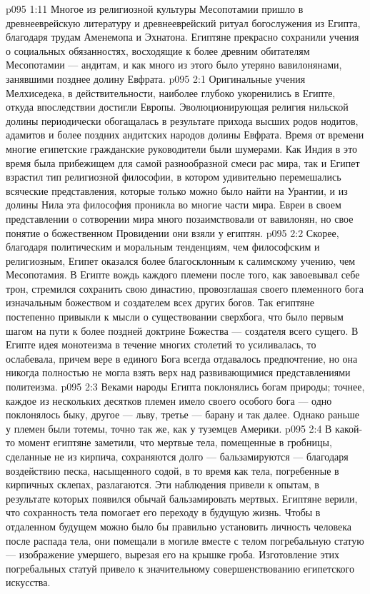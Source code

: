\vs p095 1:11 Многое из религиозной культуры Месопотамии пришло в древнееврейскую литературу и древнееврейский ритуал богослужения из Египта, благодаря трудам Аменемопа и Эхнатона. Египтяне прекрасно сохранили учения о социальных обязанностях, восходящие к более древним обитателям Месопотамии --- андитам, и как много из этого было утеряно вавилонянами, занявшими позднее долину Евфрата.
\vs p095 2:1 Оригинальные учения Мелхиседека, в действительности, наиболее глубоко укоренились в Египте, откуда впоследствии достигли Европы. Эволюционирующая религия нильской долины периодически обогащалась в результате прихода высших родов нодитов, адамитов и более поздних андитских народов долины Евфрата. Время от времени многие египетские гражданские руководители были шумерами. Как Индия в это время была прибежищем для самой разнообразной смеси рас мира, так и Египет взрастил тип религиозной философии, в котором удивительно перемешались всяческие представления, которые только можно было найти на Урантии, и из долины Нила эта философия проникла во многие части мира. Евреи в своем представлении о сотворении мира много позаимствовали от вавилонян, но свое понятие о божественном Провидении они взяли у египтян.
\vs p095 2:2 Скорее, благодаря политическим и моральным тенденциям, чем философским и религиозным, Египет оказался более благосклонным к салимскому учению, чем Месопотамия. В Египте вождь каждого племени после того, как завоевывал себе трон, стремился сохранить свою династию, провозглашая своего племенного бога изначальным божеством и создателем всех других богов. Так египтяне постепенно привыкли к мысли о существовании сверхбога, что было первым шагом на пути к более поздней доктрине Божества --- создателя всего сущего. В Египте идея монотеизма в течение многих столетий то усиливалась, то ослабевала, причем вере в единого Бога всегда отдавалось предпочтение, но она никогда полностью не могла взять верх над развивающимися представлениями политеизма.
\vs p095 2:3 Веками народы Египта поклонялись богам природы; точнее, каждое из нескольких десятков племен имело своего особого бога --- одно поклонялось быку, другое --- льву, третье --- барану и так далее. Однако раньше у племен были тотемы, точно так же, как у туземцев Америки.
\vs p095 2:4 \pc В какой\hyp{}то момент египтяне заметили, что мертвые тела, помещенные в гробницы, сделанные не из кирпича, сохраняются долго --- бальзамируются --- благодаря воздействию песка, насыщенного содой, в то время как тела, погребенные в кирпичных склепах, разлагаются. Эти наблюдения привели к опытам, в результате которых появился обычай бальзамировать мертвых. Египтяне верили, что сохранность тела помогает его переходу в будущую жизнь. Чтобы в отдаленном будущем можно было бы правильно установить личность человека после распада тела, они помещали в могиле вместе с телом погребальную статую --- изображение умершего, вырезая его на крышке гроба. Изготовление этих погребальных статуй привело к значительному совершенствованию египетского искусства.
